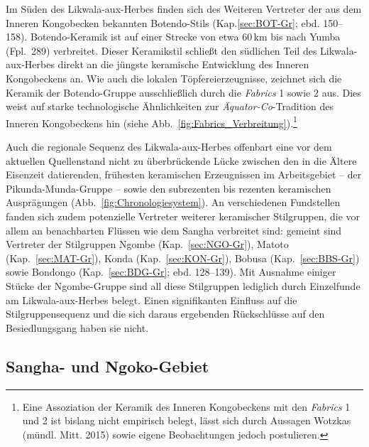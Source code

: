 Im Süden des \mbox{Likwala}-\mbox{aux}-\mbox{Herbes} finden sich des Weiteren Vertreter der aus dem Inneren Kongobecken bekannten Botendo-Stils (Kap.\ref{sec:BOT-Gr}; ebd. 150--158). Botendo-Keramik ist auf einer Strecke von etwa 60\,km bis nach Yumba (Fpl.~289) verbreitet. Dieser Keramikstil schließt den südlichen Teil des \mbox{Likwala}-\mbox{aux}-\mbox{Herbes} direkt an die jüngste keramische Entwicklung des Inneren Kongobeckens an. Wie auch die lokalen Töpfereierzeugnisse, zeichnet sich die Keramik der Botendo-Gruppe ausschließlich durch die \textit{Fabrics} 1 sowie 2 aus. Dies weist auf starke technologische Ähnlichkeiten zur \textit{Äquator-Co}-Tradition des Inneren Kongobeckens hin (siehe Abb.~\ref{fig:Fabrics_Verbreitung}).\footnote{Eine Assoziation der Keramik des Inneren Kongobeckens mit den \textit{Fabrics} 1 und 2 ist bislang nicht empirisch belegt, lässt sich durch Aussagen Wotzkas (mündl. Mitt. 2015) sowie eigene Beobachtungen jedoch postulieren.}

Auch die regionale Sequenz des \mbox{Likwala}-\mbox{aux}-\mbox{Herbes} offenbart eine vor dem aktuellen Quellenstand nicht zu überbrückende Lücke zwischen den in die Ältere Eisenzeit datierenden, frühesten keramischen Erzeugnissen im Arbeitsgebiet -- der Pikunda-Munda-Gruppe -- sowie den subrezenten bis rezenten keramischen Ausprägungen (Abb.~\ref{fig:Chronologiesystem}). An verschiedenen Fundstellen fanden sich zudem potenzielle Vertreter weiterer keramischer Stilgruppen, die vor allem an benachbarten Flüssen wie dem \mbox{Sangha} verbreitet sind: gemeint sind Vertreter der Stilgruppen Ngombe (Kap.~\ref{sec:NGO-Gr}), Matoto (Kap.~\ref{sec:MAT-Gr}), Konda (Kap.~\ref{sec:KON-Gr}), Bobusa (Kap.~\ref{sec:BBS-Gr}) sowie Bondongo (Kap.~\ref{sec:BDG-Gr}; ebd. 128--139). Mit Ausnahme einiger Stücke der Ngombe-Gruppe sind all diese Stilgruppen lediglich durch Einzelfunde am \mbox{Likwala}-\mbox{aux}-\mbox{Herbes} belegt. Einen signifikanten Einfluss auf die Stilgruppensequenz und die sich daraus ergebenden Rückschlüsse auf den Besiedlungsgang haben sie nicht.


\subsection{\mbox{Sangha}- und \mbox{Ngoko}-Gebiet}\label{sec:SequenzSanghaNgoko}

